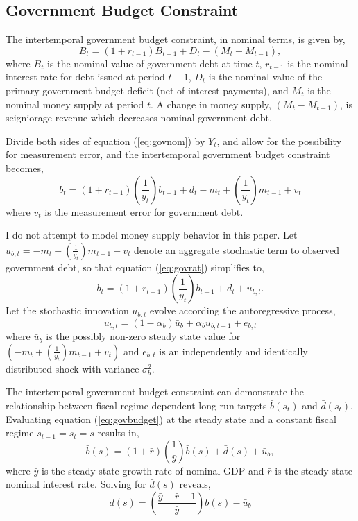 \documentclass[11pt]{article}
\newcommand{\beq}{\begin{equation}}
\newcommand{\eeq}{\end{equation}}
\newcommand{\bdm}{\begin{displaymath}}
\newcommand{\edm}{\end{displaymath}}
\begin{document}
\subsection{Government Budget Constraint}

The intertemporal government budget constraint, in nominal terms, is given by,
\beq \label{eq:govnom} B_t = (1 + r_{t-1}) B_{t-1} + D_t - \left( M_t - M_{t-1} \right), \eeq
where $B_t$ is the nominal value of government debt at time $t$, $r_{t-1}$ is the nominal interest rate for debt issued at period $t-1$, $D_t$ is the nominal value of the primary government budget deficit (net of interest payments), and $M_t$ is the nominal money supply at period $t$. A change in money supply, $(M_t-M_{t-1})$, is seigniorage revenue which decreases nominal government debt.  

Divide both sides of equation (\ref{eq:govnom}) by $Y_t$, and allow for the possibility for measurement error, and the intertemporal government budget constraint becomes,
\beq \label{eq:govrat} b_t = (1+r_{t-1}) \left(\frac{1}{y_t}\right) b_{t-1} + d_t - m_t + \left(\frac{1}{y_t}\right) m_{t-1} + v_t \eeq
where $v_t$ is the measurement error for government debt.

I do not attempt to model money supply behavior in this paper.  Let $u_{b,t} = - m_t + \left(\frac{1}{y_t}\right) m_{t-1} + v_t$ denote an aggregate stochastic term to observed government debt, so that equation (\ref{eq:govrat}) simplifies to,
\beq \label{eq:govbudget} b_t = (1+r_{t-1}) \left(\frac{1}{y_t}\right) b_{t-1} + d_t + u_{b,t}. \eeq
Let the stochastic innovation $u_{b,t}$ evolve according the autoregressive process,
\beq \label{eq:debtshock} u_{b,t} = (1-\alpha_b) \bar{u}_b + \alpha_b u_{b,t-1} + e_{b,t} \eeq
where $\bar{u}_b$ is the possibly non-zero steady state value for $\left( - m_t + \left(\frac{1}{y_t}\right) m_{t-1} + v_t \right)$ and $e_{b,t}$ is an independently and identically distributed shock with variance $\sigma_b^2$.

The intertemporal government budget constraint can demonstrate the relationship between fiscal-regime dependent long-run targets $\bar{b}(s_t)$ and $\bar{d}(s_t)$.  Evaluating equation (\ref{eq:govbudget}) at the steady state and a constant fiscal regime $s_{t-1}=s_t=s$ results in,
\bdm \bar{b}(s) = (1+\bar{r}) \left(\frac{1}{\bar{y}}\right) \bar{b}(s) + \bar{d}(s) + \bar{u}_b, \edm
where $\bar{y}$ is the steady state growth rate of nominal GDP and $\bar{r}$ is the steady state nominal interest rate.  Solving for $\bar{d}(s)$ reveals,
\beq \label{eq:bbar} \bar{d}(s) = \left( \frac{\bar{y}-\bar{r}-1}{\bar{y}} \right) \bar{b}(s) - \bar{u}_b \eeq
\end{document}
